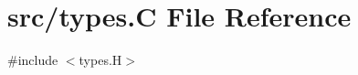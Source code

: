 \hypertarget{types_8_c}{}\section{src/types.C File Reference}
\label{types_8_c}
{\ttfamily \#include $<$types.\+H$>$}\newline
